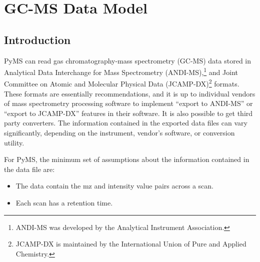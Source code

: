

\chapter{GC-MS Data Model}

\section{Introduction}

PyMS can read gas chromatography-mass spectrometry (GC-MS) data stored in
Analytical Data Interchange for Mass Spectrometry (ANDI-MS),\footnote{ANDI-MS
was developed by the Analytical Instrument Association.} and Joint Committee on
Atomic and Molecular Physical Data (JCAMP-DX)\footnote{JCAMP-DX is maintained by
the International Union of Pure and Applied Chemistry.} formats. These formats
are essentially recommendations, and it is up to individual vendors of mass
spectrometry processing software to implement ``export to ANDI-MS'' or ``export
to JCAMP-DX'' features in their software. It is also possible to get third party
converters. The information contained in the exported data files
can vary significantly, depending on the instrument, vendor's software, or
conversion utility.

For PyMS, the minimum set of assumptions about the information contained in the
data file are:
\begin{itemize}
    \item The data contain the mz and intensity value pairs across a scan.
    \item Each scan has a retention time.
\end{itemize}

